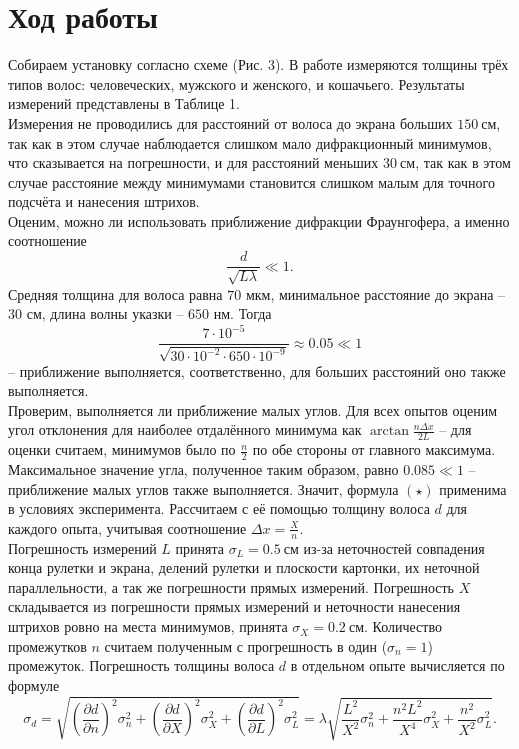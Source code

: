 \documentclass[a4paper,12pt]{article}
\begin{document}
\section*{Ход работы}
Собираем установку согласно схеме (Рис. 3). В работе измеряются толщины трёх типов волос: человеческих, мужского и женского, и кошачьего. Результаты измерений представлены в Таблице 1. \\
Измерения не проводились для расстояний от волоса до экрана больших $150~\text{см}$, так как в этом случае наблюдается слишком мало дифракционный минимумов, что сказывается на погрешности, и для расстояний меньших $30~\text{см}$, так как в этом случае расстояние между минимумами становится слишком малым для точного подсчёта и нанесения штрихов.\\
Оценим, можно ли использовать приближение дифракции Фраунгофера, а именно соотношение
$$
\dfrac{d}{\sqrt{L\lambda}} \ll 1.
$$ 
Средняя толщина для волоса равна $70$ мкм, минимальное расстояние до экрана -- $30$ см, длина волны указки -- $650$ нм. Тогда 
$$ 
\dfrac{7\cdot 10^{-5}}{\sqrt{30\cdot 10^{-2} \cdot 650 \cdot 10^{-9}}} \approx 0.05 \ll 1 
$$ 
-- приближение выполняется, соответственно, для больших расстояний оно также выполняется.\\
Проверим, выполняется ли приближение малых углов. Для всех опытов оценим угол отклонения для наиболее отдалённого минимума как $\arctan{\frac{n \Delta x}{2 L}}$ -- для оценки считаем, минимумов было по $\frac{n}{2}$ по обе стороны от главного максимума. Максимальное значение угла, полученное таким образом, равно $0.085 \ll 1$ -- приближение малых углов также выполняется. Значит, формула $(\star)$ применима в условиях эксперимента. Рассчитаем с её помощью толщину волоса $d$ для каждого опыта, учитывая соотношение $\Delta x = \frac{X}{n}$.\\
Погрешность измерений $L$ принята $\sigma_L = 0.5~\text{см}$ из-за неточностей совпадения конца рулетки и экрана, делений рулетки и плоскости картонки, их неточной параллельности, а так же погрешности прямых измерений. Погрешность $X$ складывается из погрешности прямых измерений и неточности нанесения штрихов ровно на места минимумов, принята $\sigma_X = 0.2~\text{см}$. Количество промежутков $n$ считаем полученным с прогрешность в один ($\sigma_n = 1$) промежуток. Погрешность толщины волоса $d$ в отдельном опыте вычисляется по формуле
$$
\sigma_d = \sqrt{\left(\dfrac{\partial d}{\partial n}\right)^2 \sigma^2_n + \left(\dfrac{\partial d}{\partial X}\right)^2 \sigma^2_X + \left(\dfrac{\partial d}{\partial L}\right)^2 \sigma^2_L} = \lambda \sqrt{\dfrac{L^2}{X^2} \sigma^2_n + \dfrac{n^2 L^2}{X^4} \sigma^2_X + \dfrac{n^2}{X^2} \sigma^2_L}.
$$ 
\end{document}
